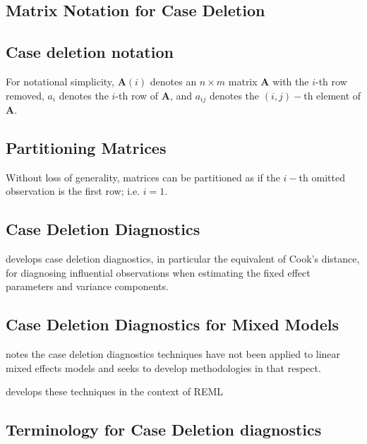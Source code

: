 \documentclass[Chap5amain.tex]{subfiles}
\begin{document}
\subsection{Matrix Notation for Case Deletion} %

\subsection{Case deletion notation} %

For notational simplicity, $\boldsymbol{A}(i)$ denotes an $n \times m$ matrix $\boldsymbol{A}$ with the $i$-th row
removed, $a_i$ denotes the $i$-th row of $\boldsymbol{A}$, and $a_{ij}$ denotes the $(i, j)-$th element of $\boldsymbol{A}$.

\subsection{Partitioning Matrices} %
Without loss of generality, matrices can be partitioned as if the $i-$th omitted observation is the first row; i.e. $i=1$.



\subsection{Case Deletion Diagnostics} %

\citet{CPJ} develops  case deletion diagnostics, in particular the equivalent of  Cook's distance, for diagnosing influential observations when estimating the fixed effect parameters and variance components.



\subsection{Case Deletion Diagnostics for Mixed Models}

\citet{Christiansen} notes the case deletion diagnostics techniques have not been applied to linear mixed effects models and seeks to develop methodologies in that respect.

\citet{Christiansen} develops these techniques in the context of REML


\newpage
\subsection{Terminology for Case Deletion diagnostics} %
\end{document}
